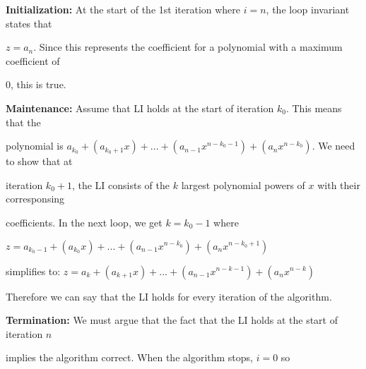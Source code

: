 \documentclass{article} %
\begin{document}
    \vspace{5pt}

    \hspace{10pt} \textbf{Initialization:} At the start of the 1st iteration where $i = n$, the loop invariant states that 
    
    \hspace{10pt} $z = a_n$. Since this represents the coefficient for a polynomial with a maximum coefficient of 
    
    \hspace{10pt} 0, this is true.

    \vspace{5pt}
 
    \hspace{12pt}\textbf{Maintenance:} Assume that LI holds at the start of iteration $k_0$. This means that the 
    
    \hspace{12pt}polynomial is $a_{k_0} + (a_{k_0 + 1} x)  + ... + (a_{n - 1}x^{n - k_0 - 1}) + (a_nx^{n - k_0})$. We need to show that at 
    
    \hspace{12pt}iteration $k_0 + 1$, the LI consists of the $k$ largest polynomial powers of $x$ with their corresponsing 
    
    \hspace{12pt}coefficients. In the next loop, we get $k = k_0 - 1$ where 
    
    \hspace{2.5cm}$z = a_{k_0 - 1} + (a_{k_0} x)  + ... + (a_{n - 1}x^{n - k_0}) + (a_nx^{n - k_0 + 1})$ 
    
    \hspace{12pt}simplifies to: $z = a_{k} + (a_{k + 1} x)  + ... + (a_{n - 1}x^{n - k - 1}) + (a_nx^{n - k})$ %
    
    \hspace{12pt}Therefore we can say that the LI holds for every iteration of the algorithm.


    \vspace{5pt}

    \hspace{12pt}\textbf{Termination:} We must argue that the fact that the LI holds at the start of iteration $n$ 
    
    \hspace{10pt} implies the algorithm correct. When the algorithm stops, $i = 0$ so 
    
\end{document}
